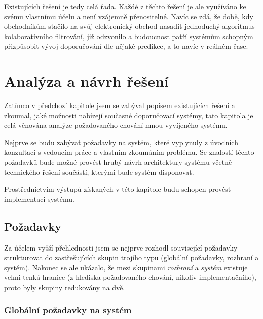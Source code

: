 \documentclass[thesis=M,czech]{FITthesis}[2014/05/07]
\begin{document}
Existujících řešení je tedy celá řada. Každé z těchto řešení je ale využíváno ke svému vlastnímu účelu a není vzájemně přenositelné. Navíc se zdá, že době, kdy obchodníkům stačilo na svůj elektronický obchod nasadit jednoduchý algoritmus kolaborativního filtrování, již odzvonilo a budoucnost patří systémům schopným přizpůsobit vývoj doporučování dle nějaké predikce, a to navíc v reálném čase. 

\chapter{Analýza a návrh řešení}
\label{chap:analysis}

Zatímco v předchozí kapitole jsem se zabýval popisem existujících řešení a zkoumal, jaké možnosti nabízejí současné doporučovací systémy, tato kapitola je celá věnována analýze požadovaného chování mnou vyvíjeného systému.

Nejprve se budu zabývat požadavky na systém, které vyplynuly z úvodních konzultací s vedoucím práce a vlastním zkoumáním problému. Se znalostí těchto požadavků bude možné provést hrubý návrh architektury systému včetně technického řešení součástí, kterými bude systém disponovat.

Prostřednictvím výstupů získaných v této kapitole budu schopen provést implementaci systému.

\section{Požadavky}

Za účelem vyšší přehlednosti jsem se nejprve rozhodl související požadavky strukturovat do zastřešujících skupin trojího typu (globální požadavky, rozhraní a systém). Nakonec se ale ukázalo, že mezi skupinami \emph{rozhraní} a \emph{systém} existuje velmi tenká hranice (z hlediska požadovaného chování, nikoliv implementačního), proto byly skupiny redukovány na dvě.

\subsection{Globální požadavky na systém}
\end{document}
